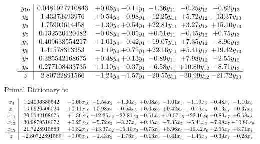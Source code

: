\documentclass[9pt]{article}
\begin{document}
\[\begin{array}{c| c c@{\hskip 2pt} c@{\hskip 2pt} c@{\hskip 2pt} c@{\hskip 2pt} c@{\hskip 2pt} }
 y_{10}   &  0.0481927710843 & +  0.06 y_{4} & -0.11 y_{1} & -1.36 y_{11} & -0.25 y_{12} & -0.82 y_{13}\\
 y_{2}   &  1.43373493976 & +  0.54 y_{4} & -0.98 y_{1} & -12.25 y_{11} & +  5.72 y_{12} & -13.37 y_{13}\\
 y_{3}   &  1.75903614458 & -1.30 y_{4} & +  0.54 y_{1} & + 22.81 y_{11} & +  3.27 y_{12} & + 15.10 y_{13}\\
 y_{9}   &  0.132530120482 & -0.08 y_{4} & -0.05 y_{1} & +  0.51 y_{11} & -0.45 y_{12} & +  0.75 y_{13}\\
 y_{5}   &  0.409638554217 & +  1.01 y_{4} & -0.42 y_{1} & -19.07 y_{11} & +  7.35 y_{12} & -8.96 y_{13}\\
 y_{6}   &  1.44578313253 & -1.19 y_{4} & +  0.75 y_{1} & + 22.16 y_{11} & +  5.41 y_{12} & + 19.42 y_{13}\\
 y_{7}   &  0.385542168675 & +  0.48 y_{4} & +  0.13 y_{1} & -0.89 y_{11} & +  7.98 y_{12} & -2.55 y_{13}\\
 y_{8}   &  0.277108433735 & +  1.10 y_{4} & -0.37 y_{1} & -6.58 y_{11} & + 10.80 y_{12} & -8.71 y_{13}\\
\hline
z    &  2.80722891566 & -1.24 y_{4} & -1.57 y_{1} & -20.55 y_{11} & -30.99 y_{12} & -21.72 y_{13}\\
\end{array}\]
Primal Dictionary is:
\[\begin{array}{c| c c@{\hskip 2pt} c@{\hskip 2pt} c@{\hskip 2pt} c@{\hskip 2pt} c@{\hskip 2pt} c@{\hskip 2pt} c@{\hskip 2pt} c@{\hskip 2pt} }
 x_{4}   &  1.24096385542 & -0.06 x_{10} & -0.54 x_{2} & +  1.30 x_{3} & +  0.08 x_{9} & -1.01 x_{5} & +  1.19 x_{6} & -0.48 x_{7} & -1.10 x_{8}\\
 x_{1}   &  1.56626506024 & +  0.11 x_{10} & +  0.98 x_{2} & -0.54 x_{3} & +  0.05 x_{9} & +  0.42 x_{5} & -0.75 x_{6} & -0.13 x_{7} & +  0.37 x_{8}\\
 x_{11}   &  20.5542168675 & +  1.36 x_{10} & + 12.25 x_{2} & -22.81 x_{3} & -0.51 x_{9} & + 19.07 x_{5} & -22.16 x_{6} & +  0.89 x_{7} & +  6.58 x_{8}\\
 x_{12}   &  30.9879518072 & +  0.25 x_{10} & -5.72 x_{2} & -3.27 x_{3} & +  0.45 x_{9} & -7.35 x_{5} & -5.41 x_{6} & -7.98 x_{7} & -10.80 x_{8}\\
 x_{13}   &  21.7228915663 & +  0.82 x_{10} & + 13.37 x_{2} & -15.10 x_{3} & -0.75 x_{9} & +  8.96 x_{5} & -19.42 x_{6} & +  2.55 x_{7} & +  8.71 x_{8}\\
\hline
z    &  -2.80722891566 & -0.05 x_{10} & -1.43 x_{2} & -1.76 x_{3} & -0.13 x_{9} & -0.41 x_{5} & -1.45 x_{6} & -0.39 x_{7} & -0.28 x_{8}\\
\end{array}\]
\end{document}
